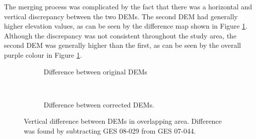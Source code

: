\documentclass[12pt]{article}
\begin{document}
The merging process was complicated by the fact that there was a horizontal and vertical discrepancy between the two DEMs. The second DEM had generally higher elevation values, as can be seen by the difference map shown in Figure \ref{fig:DEMdifferenceOriginal}. Although the discrepancy was not consistent throughout the study area, the second DEM was generally higher than the first, as can be seen by the overall purple colour in Figure \ref{fig:DEMdifferenceOriginal}. 

\begin{figure}[H]
    \centering
    \begin{subfigure}[b]{0.48\textwidth}
        \caption{Difference between original DEMs}
        \label{fig:DEMdifferenceOriginal}
    \end{subfigure}
    ~
    \begin{subfigure}[b]{0.48\textwidth}
        \caption{Difference between corrected DEMs.}
        \label{fig:DEMdifferenceCorrected}
    \end{subfigure}

    \caption{Vertical difference between DEMs in overlapping area. Difference was found by subtracting GES 08-029 from GES 07-044.}
    \label{fig:DEMdifference}
\end{figure}
\end{document}
